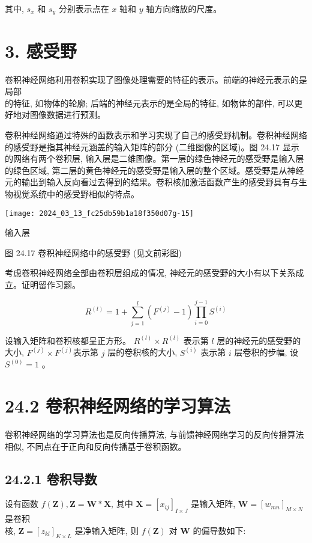 \documentclass[10pt]{article}
\begin{document}
其中, $s_{x}$ 和 $s_{y}$ 分别表示点在 $x$ 轴和 $y$ 轴方向缩放的尺度。

\section*{3. 感受野}
卷积神经网络利用卷积实现了图像处理需要的特征的表示。前端的神经元表示的是局部\\
的特征, 如物体的轮廓; 后端的神经元表示的是全局的特征, 如物体的部件, 可以更好地对图像数据进行预测。

卷积神经网络通过特殊的函数表示和学习实现了自己的感受野机制。卷积神经网络的感受野是指其神经元涵盖的输入矩阵的部分 (二维图像的区域)。图 24.17 显示的网络有两个卷积层, 输入层是二维图像。第一层的绿色神经元的感受野是输入层的绿色区域, 第二层的黄色神经元的感受野是输入层的整个区域。感受野是从神经元的输出到输入反向看过去得到的结果。卷积核加激活函数产生的感受野具有与生物视觉系统中的感受野相似的特点。

\begin{center}
\texttt{[image: 2024\_03\_13\_fc25db59b1a18f350d07g-15]}
\end{center}

输入层

图 24.17 卷积神经网络中的感受野 (见文前彩图)

考虑卷积神经网络全部由卷积层组成的情况, 神经元的感受野的大小有以下关系成立。证明留作习题。


\begin{equation*}
R^{(l)}=1+\sum_{j=1}^{l}\left(F^{(j)}-1\right) \prod_{i=0}^{j-1} S^{(i)} \tag{24.19}
\end{equation*}


设输入矩阵和卷积核都呈正方形。 $R^{(l)} \times R^{(l)}$ 表示第 $l$ 层的神经元的感受野的大小, $F^{(j)} \times F^{(j)}$表示第 $j$ 层的卷积核的大小, $S^{(i)}$ 表示第 $i$ 层卷积的步幅, 设 $S^{(0)}=1$ 。

\section*{24.2 卷积神经网络的学习算法}
卷积神经网络的学习算法也是反向传播算法, 与前馈神经网络学习的反向传播算法相似, 不同点在于正向和反向传播基于卷积函数。

\subsection*{24.2.1 卷积导数}
设有函数 $f(\boldsymbol{Z}), \boldsymbol{Z}=\boldsymbol{W} * \boldsymbol{X}$, 其中 $\boldsymbol{X}=\left[x_{i j}\right]_{I \times J}$ 是输入矩阵, $\boldsymbol{W}=\left[w_{m n}\right]_{M \times N}$ 是卷积\\
核, $\boldsymbol{Z}=\left[z_{k l}\right]_{K \times L}$ 是净输入矩阵, 则 $f(\boldsymbol{Z})$ 对 $\boldsymbol{W}$ 的偏导数如下:
\end{document}
